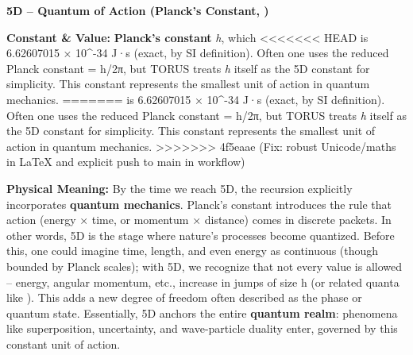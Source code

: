 \documentclass[]{article}
\begin{document}
\textbf{5D -- Quantum of Action (Planck's Constant, \hbar)}

\textbf{Constant \& Value:} \textbf{Planck's constant} \emph{h}, which
<<<<<<< HEAD
is 6.62607015 × 10\^{}-34 J·s (exact, by SI definition)\hspace{0pt}.
Often one uses the reduced Planck constant \hbar = h/2π, but TORUS treats
\emph{h} itself as the 5D constant for simplicity. This constant
represents the smallest unit of action in quantum mechanics.
=======
is 6.62607015 × 10\^{}-34 J·s (exact, by SI definition)​. Often one uses
the reduced Planck constant \hbar = h/2π, but TORUS treats \emph{h} itself
as the 5D constant for simplicity. This constant represents the smallest
unit of action in quantum mechanics.
>>>>>>> 4f5eaae (Fix: robust Unicode/maths in LaTeX and explicit push to main in workflow)

\textbf{Physical Meaning:} By the time we reach 5D, the recursion
explicitly incorporates \textbf{quantum mechanics}. Planck's constant
introduces the rule that action (energy × time, or momentum × distance)
comes in discrete packets. In other words, 5D is the stage where
nature's processes become quantized​. Before this, one could imagine
time, length, and even energy as continuous (though bounded by Planck
scales); with 5D, we recognize that not every value is allowed --
energy, angular momentum, etc., increase in jumps of size h (or related
quanta like \hbar). This adds a new degree of freedom often described as the
phase or quantum state. Essentially, 5D anchors the entire
\textbf{quantum realm}: phenomena like superposition, uncertainty, and
wave-particle duality enter, governed by this constant unit of action.
\end{document}
